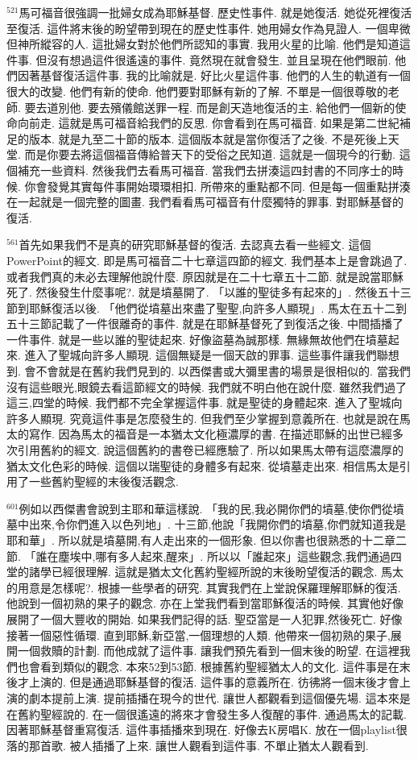 \documentclass{book}
\begin{document}
$^{521}$馬可福音很強調一批婦女成為耶穌基督.
歷史性事件.
就是她復活.
她從死裡復活至復活.
這件將末後的盼望帶到現在的歷史性事件.
她用婦女作為見證人.
一個卑微但神所縱容的人.
這批婦女對於他們所認知的事實.
我用火星的比喻.
他們是知道這件事.
但沒有想過這件很遙遠的事件.
竟然現在就會發生.
並且呈現在他們眼前.
他們因著基督復活這件事.
我的比喻就是.
好比火星這件事.
他們的人生的軌道有一個很大的改變.
他們有新的使命.
他們要對耶穌有新的了解.
不單是一個很尊敬的老師.
要去道別他.
要去殯儀館送罪一程.
而是創天造地復活的主.
給他們一個新的使命向前走.
這就是馬可福音給我們的反思.
你會看到在馬可福音.
如果是第二世紀補足的版本.
就是九至二十節的版本.
這個版本就是當你復活了之後.
不是死後上天堂.
而是你要去將這個福音傳給普天下的受俗之民知道.
這就是一個現今的行動.
這個補充一些資料.
然後我們去看馬可福音.
當我們去拼湊這四封書的不同序士的時候.
你會發覺其實每件事開始環環相扣.
所帶來的重點都不同.
但是每一個重點拼湊在一起就是一個完整的圖畫.
我們看看馬可福音有什麼獨特的罪事.
對耶穌基督的復活.

$^{561}$首先如果我們不是真的研究耶穌基督的復活.
去認真去看一些經文.
這個PowerPoint的經文.
即是馬可福音二十七章這四節的經文.
我們基本上是會跳過了.
或者我們真的未必去理解他說什麼.
原因就是在二十七章五十二節.
就是說當耶穌死了.
然後發生什麼事呢?.
就是墳墓開了.
「以誰的聖徒多有起來的」.
然後五十三節到耶穌復活以後.
「他們從墳墓出來盡了聖聖,向許多人顯現」.
馬太在五十二到五十三節記載了一件很離奇的事件.
就是在耶穌基督死了到復活之後.
中間插播了一件事件.
就是一些以誰的聖徒起來.
好像盜墓為誠那樣.
無緣無故他們在墳墓起來.
進入了聖城向許多人顯現.
這個無疑是一個天啟的罪事.
這些事件讓我們聯想到.
會不會就是在舊約我們見到的.
以西傑書或大彌里書的場景是很相似的.
當我們沒有這些眼光,眼鏡去看這節經文的時候.
我們就不明白他在說什麼.
雖然我們過了這三,四堂的時候.
我們都不完全掌握這件事.
就是聖徒的身體起來.
進入了聖城向許多人顯現.
究竟這件事是怎麼發生的.
但我們至少掌握到意義所在.
也就是說在馬太的寫作.
因為馬太的福音是一本猶太文化極濃厚的書.
在描述耶穌的出世已經多次引用舊約的經文.
說這個舊約的書卷已經應驗了.
所以如果馬太帶有這麼濃厚的猶太文化色彩的時候.
這個以瑞聖徒的身體多有起來.
從墳墓走出來.
相信馬太是引用了一些舊約聖經的末後復活觀念.

$^{601}$例如以西傑書會說到主耶和華這樣說.
「我的民,我必開你們的墳墓,使你們從墳墓中出來,令你們進入以色列地」.
十三節,他說「我開你們的墳墓,你們就知道我是耶和華」.
所以就是墳墓開,有人走出來的一個形象.
但以你書也很熟悉的十二章二節.
「誰在塵埃中,哪有多人起來,醒來」.
所以以「誰起來」這些觀念,我們通過四堂的諸學已經很理解.
這就是猶太文化舊約聖經所說的末後盼望復活的觀念.
馬太的用意是怎樣呢?.
根據一些學者的研究.
其實我們在上堂說保羅理解耶穌的復活.
他說到一個初熟的果子的觀念.
亦在上堂我們看到當耶穌復活的時候.
其實他好像展開了一個大豐收的開始.
如果我們記得的話.
聖亞當是一人犯罪,然後死亡.
好像接著一個惡性循環.
直到耶穌,新亞當,一個理想的人類.
他帶來一個初熟的果子,展開一個救贖的計劃.
而他成就了這件事.
讓我們預先看到一個末後的盼望.
在這裡我們也會看到類似的觀念.
本來52到53節.
根據舊約聖經猶太人的文化.
這件事是在末後才上演的.
但是通過耶穌基督的復活.
這件事的意義所在.
彷彿將一個末後才會上演的劇本提前上演.
提前插播在現今的世代.
讓世人都觀看到這個優先場.
這本來是在舊約聖經說的.
在一個很遙遠的將來才會發生多人復醒的事件.
通過馬太的記載.
因著耶穌基督重寫復活.
這件事插播來到現在.
好像去K房唱K.
放在一個playlist很落的那首歌.
被人插播了上來.
讓世人觀看到這件事.
不單止猶太人觀看到.
\end{document}
